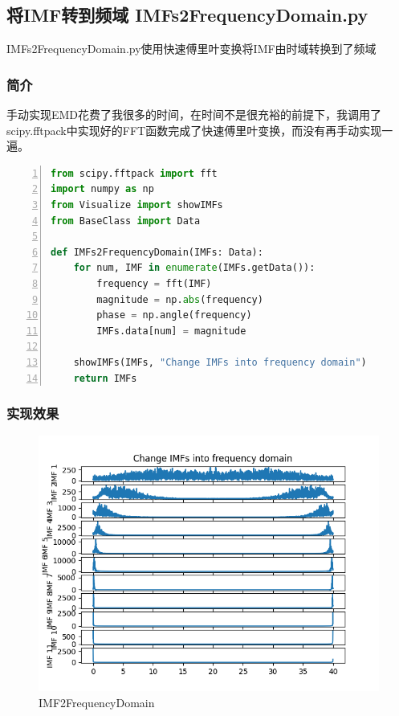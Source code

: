 \documentclass[cs4size,a4paper]{ctexart}
\numberwithin{equation}{section}
\numberwithin{table}{section}
\numberwithin{figure}{section}
\begin{document}
\subsection{将IMF转到频域 IMFs2FrequencyDomain.py}

\colorbox{LetMeFlyGray}{IMFs2FrequencyDomain.py}使用快速傅里叶变换将IMF由时域转换到了频域

\subsubsection{简介}

手动实现EMD花费了我很多的时间，在时间不是很充裕的前提下，我调用了\colorbox{LetMeFlyGray}{scipy.fftpack}中实现好的FFT函数完成了快速傅里叶变换，而没有再手动实现一遍。

\begin{lstlisting}[language={python},
numbers=left,
numberstyle=\tiny\monaco,
basicstyle=\footnotesize\monaco]
from scipy.fftpack import fft
import numpy as np
from Visualize import showIMFs
from BaseClass import Data

def IMFs2FrequencyDomain(IMFs: Data):
    for num, IMF in enumerate(IMFs.getData()):
        frequency = fft(IMF)
        magnitude = np.abs(frequency)
        phase = np.angle(frequency)
        IMFs.data[num] = magnitude

    showIMFs(IMFs, "Change IMFs into frequency domain")    
    return IMFs
\end{lstlisting}

\subsubsection{实现效果}

\begin{figure}[H]
\small
\centering
\includegraphics{IMF2FrequencyDomain.png}
\caption{IMF2FrequencyDomain} \label{fig:IMF2FrequencyDomain}
\end{figure}
\end{document}
